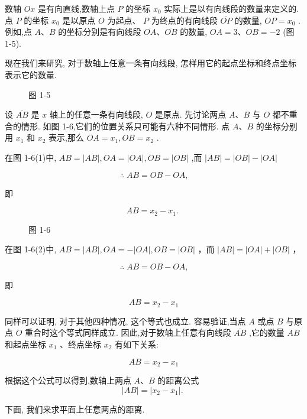 \documentclass[lang=cn,newtx,10.5pt,scheme=chinese]{elegantbook}
\begin{document}
数轴 \({Ox}\) 是有向直线,数轴上点 \(P\) 的坐标 \({x}_{0}\) 实际上是以有向线段的数量来定义的. 点 \(P\) 的坐标 \({x}_{0}\) 是以原点 \(O\) 为起点、 \(P\) 为终点的有向线段 \(\overline{OP}\) 的数量, \({OP} = {x}_{0}\) . 例如,点 \(A\text{、}B\) 的坐标分别是有向线段 \(\overline{OA}\text{、}\overline{OB}\) 的数量, \({OA} = 3\text{、}{OB} = - 2\) (图 1-5).

现在我们来研究, 对于数轴上任意一条有向线段, 怎样用它的起点坐标和终点坐标表示它的数量.

\begin{figure}[h]
  \centering
  
  \caption{图 1-5}
\end{figure}

设 \(\overline{AB}\) 是 \(x\) 轴上的任意一条有向线段, \(O\) 是原点. 先讨论两点 \(A\text{、}B\) 与 \(O\) 都不重合的情形. 如图 1-6,它们的位置关系只可能有六种不同情形. 点 \(A\text{、}B\) 的坐标分别用 \({x}_{1}\) 和 \({x}_{2}\) 表示,那么 \({OA} = {x}_{1},{OB} = {x}_{2}\) .

在图 1-6(1)中, \({AB} = \left| {AB}\right| ,{OA} = \left| {OA}\right| ,{OB} = \left| {OB}\right|\) ,而 \(\left| {AB}\right| = \left| {OB}\right| - \left| {OA}\right|\)

\[
  \therefore \;{AB} = {OB} - {OA}\text{,}
\]

即

\[
    {AB} = {x}_{2} - {x}_{1}\text{. }
\]

\begin{figure}[h]
  \centering
  
  \caption{图 1-6}
\end{figure}

在图 1-6(2)中, \({AB} = \left| {AB}\right| ,{OA} = - \left| {OA}\right| ,{OB} = \left| {OB}\right|\) ，而 \(\left| {AB}\right| = \left| {OA}\right| + \left| {OB}\right|\) ，

\[
  \therefore \;{AB} = {OB} - {OA}\text{,}
\]

即

\[
    {AB} = {x}_{2} - {x}_{1}
\]

同样可以证明, 对于其他四种情况, 这个等式也成立. 容易验证,当点 \(A\) 或点 \(B\) 与原点 \(O\) 重合时这个等式同样成立. 因此,对于数轴上任意有向线段 \(\overline{AB}\) ,它的数量 \({AB}\) 和起点坐标 \({x}_{1}\) 、终点坐标 \({x}_{2}\) 有如下关系:

\[
    {AB} = {x}_{2} - {x}_{1}
\]
\begin{corollary}[数轴两点的距离公式]
根据这个公式可以得到,数轴上两点 \(A\text{、}B\) 的距离公式
\[
  \left| {AB}\right| = \left| {{x}_{2} - {x}_{1}}\right| \text{. }
\]
\end{corollary}
下面, 我们来求平面上任意两点的距离.
\end{document}
